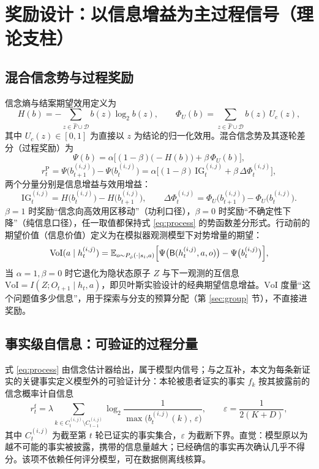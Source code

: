 \documentclass[11pt,a4paper]{ctexart}
\newcommand{\E}{\mathbb{E}}
\newcommand{\1}[1]{\mathbb{1}\!\left[#1\right]}
\newcommand{\Fhat}{\hat{F}}
\newcommand{\Dcal}{\mathcal{D}}
\newcommand{\Bupd}{\mathsf{B}}
\newcommand{\IG}{\mathrm{IG}}
\newcommand{\VoI}{\mathrm{VoI}}
\begin{document}
\section{奖励设计：以信息增益为主过程信号（理论支柱）}\label{sec:reward}

\subsection{混合信念势与过程奖励}
信念熵与结案期望效用定义为
\begin{equation}\label{eq:entropy}
H(b)=-\sum_{z\in\Fhat\cup\Dcal} b(z)\log_2 b(z),
\qquad
\Phi_U(b)=\sum_{z\in\Fhat\cup\Dcal} b(z)\,U_c(z),
\end{equation}
其中 $U_c(z)\in[0,1]$ 为直接以 $z$ 为结论的归一化效用。混合信念势及其逐轮差分（过程奖励）为
\begin{equation}\label{eq:potential}
\Psi(b)=\alpha\bigl[(1-\beta)\bigl(-H(b)\bigr)+\beta\,\Phi_U(b)\bigr],
\end{equation}
\begin{equation}\label{eq:process}
r_t^{\mathrm{P}}
=\Psi\bigl(b_{t+1}^{(i,j)}\bigr)-\Psi\bigl(b_t^{(i,j)}\bigr)
=\alpha\bigl[(1-\beta)\,\IG_t^{(i,j)}+\beta\,\Delta\Phi_t^{(i,j)}\bigr],
\end{equation}
两个分量分别是信息增益与效用增益：
\begin{equation}\label{eq:ig}
\IG_t^{(i,j)}=H\bigl(b_t^{(i,j)}\bigr)-H\bigl(b_{t+1}^{(i,j)}\bigr),
\qquad
\Delta\Phi_t^{(i,j)}=\Phi_U\bigl(b_{t+1}^{(i,j)}\bigr)-\Phi_U\bigl(b_t^{(i,j)}\bigr).
\end{equation}
$\beta=1$ 时奖励``信念向高效用区移动''（功利口径），$\beta=0$ 时奖励``不确定性下降''（纯信息口径），任一取值都保持式 \eqref{eq:process} 的势函数差分形式。行动前的期望价值（信息价值）定义为在模拟器观测模型下对势增量的期望：
\begin{equation}\label{eq:voi}
\VoI(a\mid h_t^{(i,j)})
=\E_{o\sim P_\phi(\cdot\mid s_i,a)}
\Bigl[\Psi\bigl(\Bupd(h_t^{(i,j)},a,o)\bigr)-\Psi\bigl(b_t^{(i,j)}\bigr)\Bigr],
\end{equation}
当 $\alpha=1,\beta=0$ 时它退化为隐状态原子 $Z$ 与下一观测的互信息 $\VoI=I(Z;O_{t+1}\mid h_t,a)$，即贝叶斯实验设计的经典期望信息增益。$\VoI$ 度量``这个问题值多少信息''，用于探索与分支的预算分配（第 \ref{sec:group} 节），不直接进奖励。

\subsection{事实级自信息：可验证的过程分量}
式 \eqref{eq:process} 由信念估计器给出，属于模型内信号；与之互补，本文为每条新证实的关键事实定义模型外的可验证计分：本轮被患者证实的事实 $f_k$ 按其披露前的信念概率计自信息
\begin{equation}\label{eq:fact}
r_t^{\mathrm{f}}
=\lambda\!\!\sum_{k\in C_t^{(i,j)}\setminus C_{t-1}^{(i,j)}}
\log_2\frac{1}{\max\bigl(b_t^{(i,j)}(k),\,\varepsilon\bigr)},
\qquad
\varepsilon=\frac{1}{2(K+D)},
\end{equation}
其中 $C_t^{(i,j)}$ 为截至第 $t$ 轮已证实的事实集合，$\varepsilon$ 为截断下界。直觉：模型原以为越不可能的事实被披露，携带的信息量越大；已经确信的事实再次确认几乎不得分。该项不依赖任何评分模型，可在数据侧离线核算。
\end{document}
